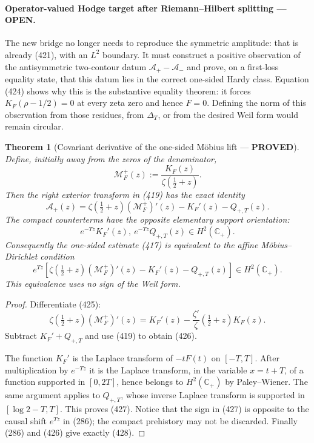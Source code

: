 \documentclass[11pt]{article}
\newtheorem{theorem}{Theorem}
\newcommand{\PROVED}{\textcolor{green!45!black}{\textbf{PROVED}}}
\newcommand{\OPEN}{\textcolor{red!70!black}{\textbf{OPEN}}}
\begin{document}
\paragraph{Operator-valued Hodge target after Riemann--Hilbert splitting ---
\OPEN.}
The new bridge no longer needs to reproduce the symmetric amplitude: that
is already (421), with an $L^2$ boundary.  It must construct a positive
observation of the antisymmetric two-contour datum
$\mathscr A_+-\mathscr A_-$ and prove, on a first-loss equality state, that
this datum lies in the correct one-sided Hardy class.  Equation (424) shows
why this is the substantive equality theorem: it forces
$K_F(\rho-1/2)=0$ at every zeta zero and hence $F=0$.  Defining the norm of
this observation from those residues, from $\Delta_T$, or from the desired
Weil form would remain circular.

\begin{theorem}[Covariant derivative of the one-sided M\"obius lift ---
\PROVED]
Define, initially away from the zeros of the denominator,
\begin{equation}
 \mathcal M_F^+(z):=
 \frac{K_F(z)}{\zeta(\tfrac12+z)}.                   \tag{425}
\end{equation}
Then the right exterior transform in (419) has the exact identity
\begin{equation}
 \boxed{\mathscr A_+(z)
 =\zeta(\tfrac12+z)(\mathcal M_F^+)'(z)
   -K_F'(z)-Q_{+,T}(z).}                             \tag{426}
\end{equation}
The compact counterterms have the opposite elementary support orientation:
\begin{equation}
 e^{-Tz}K_F'(z),\ e^{-Tz}Q_{+,T}(z)\in H^2(\mathbb C_+). \tag{427}
\end{equation}
Consequently the one-sided estimate (417) is equivalent to the affine
M\"obius--Dirichlet condition
\begin{equation}
 \boxed{
 e^{Tz}\left[
 \zeta(\tfrac12+z)(\mathcal M_F^+)'(z)
 -K_F'(z)-Q_{+,T}(z)\right]
 \in H^2(\mathbb C_+).}                              \tag{428}
\end{equation}
This equivalence uses no sign of the Weil form.
\end{theorem}

\begin{proof}
Differentiate (425):
\[
 \zeta(\tfrac12+z)(\mathcal M_F^+)'(z)
 =K_F'(z)-\frac{\zeta'}{\zeta}(\tfrac12+z)K_F(z).
\]
Subtract $K_F'+Q_{+,T}$ and use (419) to obtain (426).

The function $K_F'$ is the Laplace transform of $-tF(t)$ on $[-T,T]$.
After multiplication by $e^{-Tz}$ it is the Laplace transform, in the
variable $x=t+T$, of a function supported in $[0,2T]$, hence belongs to
$H^2(\mathbb C_+)$ by Paley--Wiener.  The same argument applies to
$Q_{+,T}$, whose inverse Laplace transform is supported in
$[\log2-T,T]$.  This proves (427).  Notice that the sign in (427) is
opposite to the causal shift $e^{Tz}$ in (286); the compact prehistory may
not be discarded.  Finally (286) and (426) give exactly (428).
\end{proof}
\end{document}
